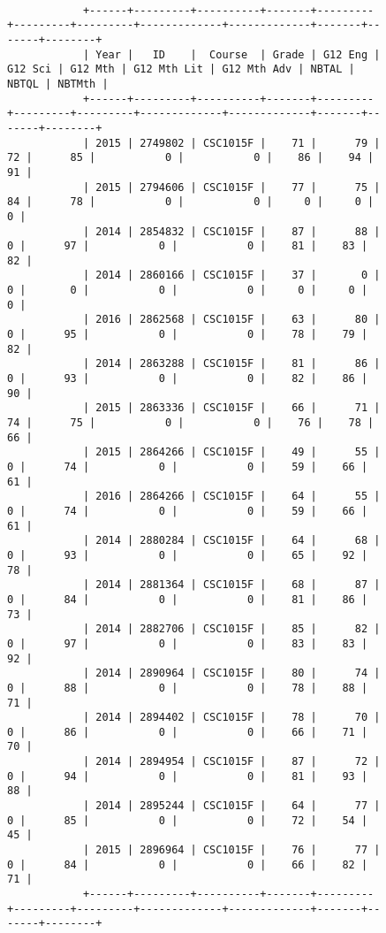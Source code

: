 \begin{figure}[H]
    \centering
    \begin{mdframed}[rightline=false,leftline=false]
        \begin{BVerbatim}[fontsize=\tiny]

            +------+---------+----------+-------+---------+---------+---------+-------------+-------------+-------+-------+--------+
            | Year |   ID    |  Course  | Grade | G12 Eng | G12 Sci | G12 Mth | G12 Mth Lit | G12 Mth Adv | NBTAL | NBTQL | NBTMth |
            +------+---------+----------+-------+---------+---------+---------+-------------+-------------+-------+-------+--------+
            | 2015 | 2749802 | CSC1015F |    71 |      79 |      72 |      85 |           0 |           0 |    86 |    94 |     91 |
            | 2015 | 2794606 | CSC1015F |    77 |      75 |      84 |      78 |           0 |           0 |     0 |     0 |      0 |
            | 2014 | 2854832 | CSC1015F |    87 |      88 |       0 |      97 |           0 |           0 |    81 |    83 |     82 |
            | 2014 | 2860166 | CSC1015F |    37 |       0 |       0 |       0 |           0 |           0 |     0 |     0 |      0 |
            | 2016 | 2862568 | CSC1015F |    63 |      80 |       0 |      95 |           0 |           0 |    78 |    79 |     82 |
            | 2014 | 2863288 | CSC1015F |    81 |      86 |       0 |      93 |           0 |           0 |    82 |    86 |     90 |
            | 2015 | 2863336 | CSC1015F |    66 |      71 |      74 |      75 |           0 |           0 |    76 |    78 |     66 |
            | 2015 | 2864266 | CSC1015F |    49 |      55 |       0 |      74 |           0 |           0 |    59 |    66 |     61 |
            | 2016 | 2864266 | CSC1015F |    64 |      55 |       0 |      74 |           0 |           0 |    59 |    66 |     61 |
            | 2014 | 2880284 | CSC1015F |    64 |      68 |       0 |      93 |           0 |           0 |    65 |    92 |     78 |
            | 2014 | 2881364 | CSC1015F |    68 |      87 |       0 |      84 |           0 |           0 |    81 |    86 |     73 |
            | 2014 | 2882706 | CSC1015F |    85 |      82 |       0 |      97 |           0 |           0 |    83 |    83 |     92 |
            | 2014 | 2890964 | CSC1015F |    80 |      74 |       0 |      88 |           0 |           0 |    78 |    88 |     71 |
            | 2014 | 2894402 | CSC1015F |    78 |      70 |       0 |      86 |           0 |           0 |    66 |    71 |     70 |
            | 2014 | 2894954 | CSC1015F |    87 |      72 |       0 |      94 |           0 |           0 |    81 |    93 |     88 |
            | 2014 | 2895244 | CSC1015F |    64 |      77 |       0 |      85 |           0 |           0 |    72 |    54 |     45 |
            | 2015 | 2896964 | CSC1015F |    76 |      77 |       0 |      84 |           0 |           0 |    66 |    82 |     71 |
            +------+---------+----------+-------+---------+---------+---------+-------------+-------------+-------+-------+--------+


\end{BVerbatim}
\end{mdframed}
\end{figure}
